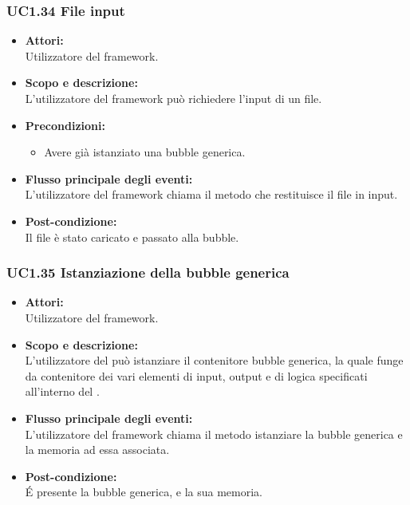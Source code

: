 \subsubsection{UC1.34 File input} \label{UC1.34}

\begin{itemize}
	\item \textbf{Attori:}
	\\Utilizzatore del framework.
	\item \textbf{Scopo e descrizione:} 
	\\L’utilizzatore del framework può richiedere l’input di un file.
	\item \textbf{Precondizioni:}
	\begin{itemize}
		\item Avere già istanziato una bubble generica.
	\end{itemize}
	\item \textbf{Flusso principale degli eventi:}
	\\L’utilizzatore del framework chiama il metodo che restituisce il file in input.
	\item \textbf{Post-condizione:}
	\\Il file è stato caricato e passato alla bubble.
\end{itemize}

\subsubsection{UC1.35 Istanziazione della bubble generica} \label{UC1.35}

\begin{itemize}
	\item \textbf{Attori:}
	\\Utilizzatore del framework.
	\item \textbf{Scopo e descrizione:} 
	\\L’utilizzatore del  può istanziare il contenitore bubble generica, la quale funge da contenitore dei vari elementi di input, output e di logica specificati all'interno del .
	\item \textbf{Flusso principale degli eventi:}
	\\L’utilizzatore del framework chiama il metodo istanziare la bubble generica e la memoria ad essa associata.
	\item \textbf{Post-condizione:}
	\\É presente la bubble generica, e la sua memoria.
\end{itemize}

